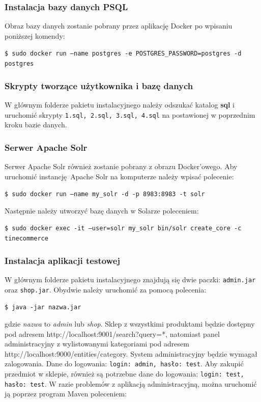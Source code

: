 \subsubsection{Instalacja bazy danych PSQL}
Obraz bazy danych zostanie pobrany przez aplikację Docker po wpisaniu poniższej komendy: 

\noindent
\texttt{\$ sudo docker run --name postgres -e POSTGRES\_PASSWORD=postgres -d postgres}

\subsubsection{Skrypty tworzące użytkownika i bazę danych}
W głównym folderze pakietu instalacyjnego należy odszukać katalog \textbf{sql} i uruchomić skrypty \texttt{1.sql, 2.sql, 3.sql, 4.sql} na postawionej w poprzednim kroku bazie danych.

\subsubsection{Serwer Apache Solr}
Serwer Apache Solr również zostanie pobrany z obrazu Docker'owego. Aby uruchomić instancję Apache Solr na komputerze należy wpisać polecenie: 

\noindent
\texttt{\$ sudo docker run --name my\_solr -d -p 8983:8983 -t solr}

\noindent
Następnie należy utworzyć bazę danych w Solarze poleceniem:

\noindent
\texttt{\$ sudo docker exec -it --user=solr my\_solr bin/solr create\_core -c tinecommerce}



\subsubsection{Instalacja aplikacji testowej}
W głównym folderze pakietu instalacyjnego znajdują się dwie paczki: \texttt{admin.jar} oraz \texttt{shop.jar}. Obydwie należy uruchomić za pomocą polecenia: 

\noindent
\texttt{\$ java -jar nazwa.jar}

\noindent
gdzie \textit{nazwa} to \textit{admin} lub \textit{shop}. Sklep z wszystkimi produktami będzie dostępny pod adresem http://localhost:9001/search?query=*, natomiast panel administracyjny z wylistowanymi kategoriami pod adresem http://localhost:9000/entities/category. System administracyjny będzie wymagał zalogowania. Dane do logowania: \texttt{login: admin, hasło: test}. Aby zakupić przedmiot w sklepie, również są potrzebne dane do logowania: \texttt{login: test, hasło: test}. W razie problemów z aplikacją administracyjną, można uruchomić ją poprzez program Maven poleceniem: 

